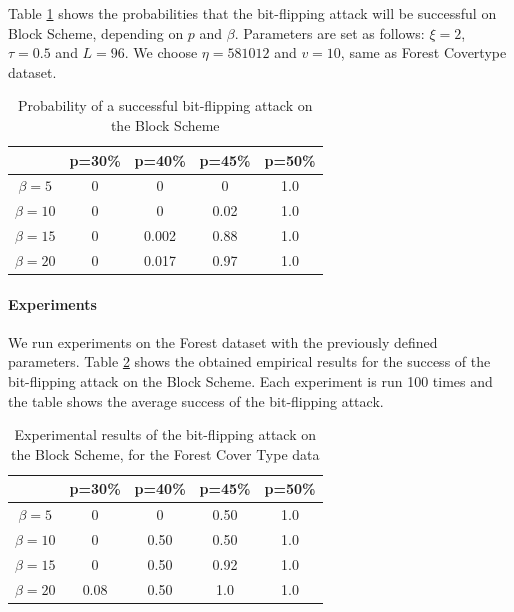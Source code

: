 Table \ref{table:bit-flipping-block} shows the probabilities that the bit-flipping attack will be successful on Block Scheme, depending on $p$ and $\beta$.
Parameters are set as follows: $\xi=2$, $\tau=0.5$ and $L=96$.
We choose $\eta=581012$ and $v=10$, same as Forest Covertype dataset. 

\begin{table}[ht]
    \centering
    \caption{Probability of a successful bit-flipping attack on the Block Scheme}
    \label{table:bit-flipping-block}
    \begin{tabular}{|c|c|c|c|c|}
    \hline
         & p=30\% & p=40\% & p=45\% & p=50\%\\
         \hline
        $\beta=5$ & 0 & 0 & 0 & 1.0 \\
        \hline
        $\beta=10$ & 0 & 0 & 0.02 & 1.0 \\
        \hline
        $\beta=15$ & 0 & 0.002 & 0.88 & 1.0 \\
        \hline
        $\beta=20$ & 0 & 0.017 & 0.97 & 1.0 \\
        \hline
    \end{tabular}
\end{table}


\paragraph{Experiments}
We run experiments on the Forest dataset with the previously defined parameters.
Table \ref{table:bit-flipping-block-emp} shows the obtained empirical results for the success of the bit-flipping attack on the Block Scheme.
Each experiment is run 100 times and the table shows the average success of the bit-flipping attack. 

\begin{table}[ht]
    \centering
    \caption{Experimental results of the bit-flipping attack on the Block Scheme, for the Forest Cover Type data}
    \begin{tabular}{|c|c|c|c|c|}
    \hline
         & p=30\% & p=40\% & p=45\% & p=50\%\\
         \hline
        $\beta=5$ & 0 & 0 & 0.50 & 1.0 \\
        \hline
        $\beta=10$ & 0 & 0.50 & 0.50 & 1.0 \\
        \hline
    $\beta=15$ & 0 & 0.50 & 0.92 & 1.0 \\
        \hline
        $\beta=20$ & 0.08 & 0.50 & 1.0 & 1.0 \\
        \hline
    \end{tabular}
    \label{table:bit-flipping-block-emp}
\end{table}

